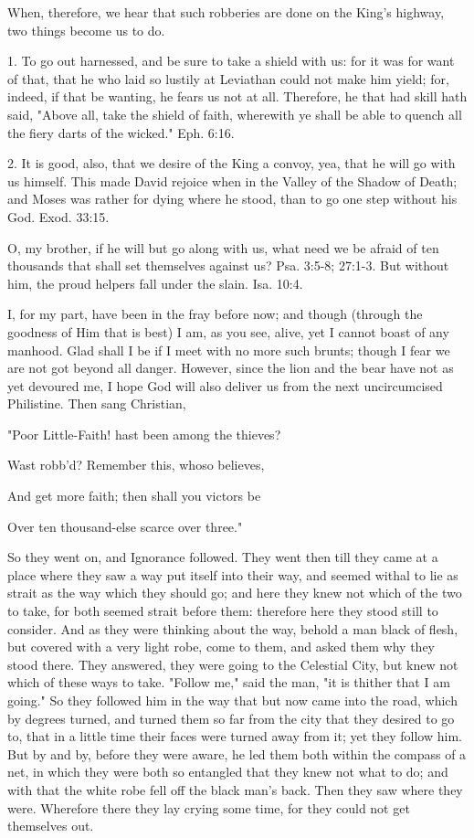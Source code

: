 When, therefore, we hear that such robberies are done on the King's
highway, two things become us to do.

1. To go out harnessed, and be sure to take a shield with us: for it
was for want of that, that he who laid so lustily at Leviathan could
not make him yield; for, indeed, if that be wanting, he fears us not at
all. Therefore, he that had skill hath said, "Above all, take the
shield of faith, wherewith ye shall be able to quench all the fiery
darts of the wicked." Eph. 6:16.

2. It is good, also, that we desire of the King a convoy, yea, that he
will go with us himself. This made David rejoice when in the Valley of
the Shadow of Death; and Moses was rather for dying where he stood,
than to go one step without his God. Exod. 33:15.

O, my brother, if he will but go along with us, what need we be afraid
of ten thousands that shall set themselves against us? Psa. 3:5-8;
27:1-3. But without him, the proud helpers fall under the slain. Isa.
10:4.

I, for my part, have been in the fray before now; and though (through
the goodness of Him that is best) I am, as you see, alive, yet I cannot
boast of any manhood. Glad shall I be if I meet with no more such
brunts; though I fear we are not got beyond all danger. However, since
the lion and the bear have not as yet devoured me, I hope God will also
deliver us from the next uncircumcised Philistine. Then sang Christian,


"Poor Little-Faith! hast been among the thieves?

Wast robb'd? Remember this, whoso believes,

And get more faith; then shall you victors be

Over ten thousand-else scarce over three."

So they went on, and Ignorance followed. They went then till they came
at a place where they saw a way put itself into their way, and seemed
withal to lie as strait as the way which they should go; and here they
knew not which of the two to take, for both seemed strait before them:
therefore here they stood still to consider. And as they were thinking
about the way, behold a man black of flesh, but covered with a very
light robe, come to them, and asked them why they stood there. They
answered, they were going to the Celestial City, but knew not which of
these ways to take. "Follow me," said the man, "it is thither that I am
going." So they followed him in the way that but now came into the
road, which by degrees turned, and turned them so far from the city
that they desired to go to, that in a little time their faces were
turned away from it; yet they follow him. But by and by, before they
were aware, he led them both within the compass of a net, in which they
were both so entangled that they knew not what to do; and with that the
white robe fell off the black man's back. Then they saw where they
were. Wherefore there they lay crying some time, for they could not get
themselves out.

